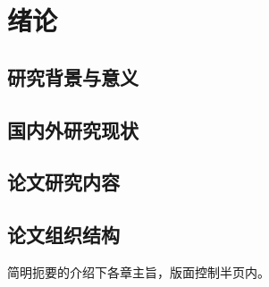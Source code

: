 

\chapter{绪论}

\section{研究背景与意义}


\section{国内外研究现状}

\section{论文研究内容}

\section{论文组织结构}

简明扼要的介绍下各章主旨，版面控制半页内。
